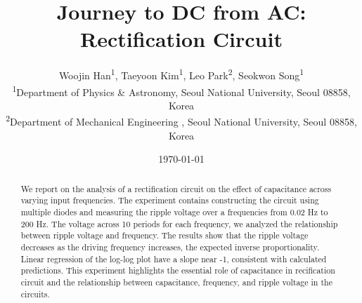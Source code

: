 \documentclass{article}
\title{\textbf{Journey to DC from AC: Rectification Circuit}}
\author{
    Woojin Han\textsuperscript{1}, Taeyoon Kim\textsuperscript{1}, Leo Park\textsuperscript{2}, Seokwon Song\textsuperscript{1}  \\
  \textsuperscript{1}Department of Physics \& Astronomy, Seoul National University, Seoul 08858, Korea \\
  \textsuperscript{2}Department of Mechanical Engineering , Seoul National University, Seoul 08858, Korea \\
  \date{\today}
}
\begin{document}
\maketitle

\begin{abstract}
We report on the analysis of a rectification circuit on the effect of capacitance across varying input frequencies.
The experiment contains constructing the circuit using multiple diodes and measuring the ripple voltage over a frequencies from 0.02 Hz to 200 Hz.
The voltage across 10 periods for each frequency, we analyzed the relationship between ripple voltage and frequency.
The results show that the ripple voltage decreases as the driving frequency increases, the expected inverse proportionality.
Linear regression of the log-log plot have a slope near -1, consistent with calculated predictions.
This experiment highlights the essential role of capacitance in recification circuit and the relationship between capacitance, frequency, and ripple voltage in the circuits.
\end{abstract}
 
\end{document}
